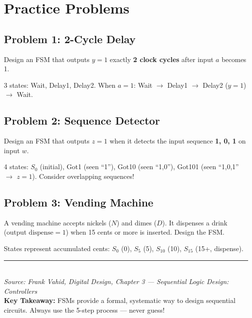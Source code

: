 \documentclass[12pt, a4paper]{article}
\begin{document}
\section{Practice Problems}

\subsection{Problem 1: 2-Cycle Delay}
Design an FSM that outputs $y=1$ exactly \textbf{2 clock cycles} after input $a$ becomes 1.

\begin{tip}[Hint]
  3 states: Wait, Delay1, Delay2. When $a=1$: Wait $\to$ Delay1 $\to$ Delay2 ($y{=}1$) $\to$ Wait.
\end{tip}

\subsection{Problem 2: Sequence Detector}
Design an FSM that outputs $z=1$ when it detects the input sequence \textbf{1, 0, 1} on input $w$.

\begin{tip}[Hint]
  4 states: $S_0$ (initial), Got1 (seen ``1''), Got10 (seen ``1,0''), Got101 (seen ``1,0,1'' $\to$ $z{=}1$). Consider overlapping sequences!
\end{tip}

\subsection{Problem 3: Vending Machine}
A vending machine accepts nickels ($N$) and dimes ($D$). It dispenses a drink (output $\text{dispense}=1$) when 15 cents or more is inserted. Design the FSM.

\begin{tip}[Hint]
  States represent accumulated cents: $S_0$ (0\textcent), $S_5$ (5\textcent), $S_{10}$ (10\textcent), $S_{15}$ (15+\textcent, dispense).
\end{tip}

\vfill
\begin{center}
  \color{gray}\rule{0.5\textwidth}{0.5pt}\\[6pt]
  {\small\textit{Source: Frank Vahid, Digital Design, Chapter 3 --- Sequential Logic Design: Controllers}}\\[4pt]
  {\small\textbf{Key Takeaway:} FSMs provide a formal, systematic way to design sequential circuits. Always use the 5-step process --- never guess!}
\end{center}
\end{document}
